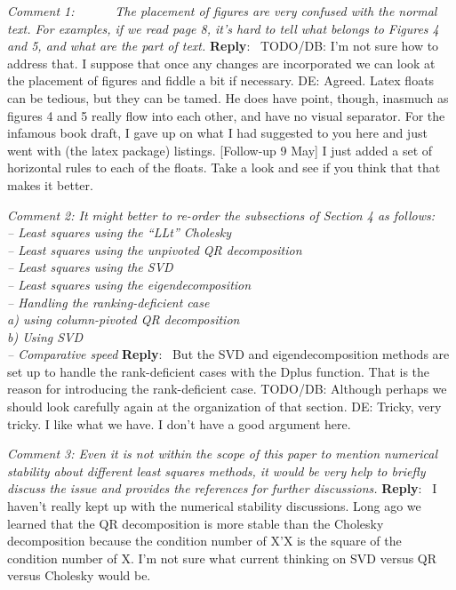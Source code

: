 \documentclass[10pt]{article}
\newcommand{\pointRaised}[2]{\smallskip %
  \textsl{{\fontseries{b}\selectfont #1}: #2}\newline}
\newcommand{\reply}[1]{\textbf{Reply}:\ #1 \smallskip } %
\begin{document}
\pointRaised{Comment 1}{     
  The placement of figures are very confused with the normal text. 
  For examples, if we read page 8, it's hard to tell what belongs to 
  Figures 4 and 5, and what are the part of text. 
}
\reply{
  TODO/DB: I'm not sure how to address that.  I suppose that once any
  changes are incorporated we can look at the placement of figures
  and fiddle a bit if necessary.
  \newline
  DE: Agreed.  Latex floats can be tedious, but they can be tamed.  He does
  have point, though, inasmuch as figures 4 and 5 really flow into each
  other, and have no visual separator. For the infamous book draft, I gave up
  on what I had suggested to you here and just went with (the latex package)
  listings.   [Follow-up 9 May] I just added a set of horizontal rules to each
  of the floats.  Take a look and see if you think that that makes it better.
}


\pointRaised{Comment 2}{
  It might better to re-order the subsections of Section 4 as follows: \\
  -- Least squares using the ``LLt'' Cholesky \\
  -- Least squares using the unpivoted QR decomposition\\
  -- Least squares using the SVD \\
  -- Least squares using the eigendecomposition \\
  -- Handling the ranking-deficient case \\
  \phantom{---} a) using column-pivoted QR decomposition \\
  \phantom{---} b) Using SVD \\
  -- Comparative speed 
}
\reply{
  But the SVD and eigendecomposition methods are set up to handle
  the rank-deficient cases with the Dplus function.  That is the
  reason for introducing the rank-deficient case. 
  TODO/DB: Although perhaps
  we should look carefully again at the organization of that section.
  DE: Tricky, very tricky.  I like what we have. I don't have a good argument
  here.
}

\pointRaised{Comment 3}{
  Even it is not within the scope of this paper to mention
  numerical stability about different least squares methods, 
  it would be very help to briefly discuss the issue and provides
  the references for further discussions. 
}
\reply{
  I haven't really kept up with the numerical stability
  discussions.  Long ago we learned that the QR decomposition is
  more stable than the Cholesky decomposition because the condition
  number of X'X is the square of the condition number of X.  I'm
  not sure what current thinking on SVD versus QR versus Cholesky
  would be.
}
\end{document}
